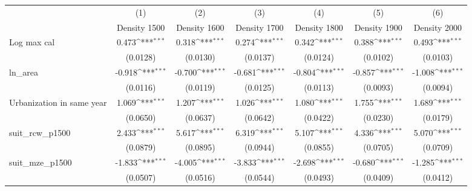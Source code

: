 {
\def\sym#1{\ifmmode^{#1}\else\(^{#1}\)\fi}
\begin{tabular}{l*{6}{c}}
\toprule
                    &\multicolumn{1}{c}{(1)}&\multicolumn{1}{c}{(2)}&\multicolumn{1}{c}{(3)}&\multicolumn{1}{c}{(4)}&\multicolumn{1}{c}{(5)}&\multicolumn{1}{c}{(6)}\\
                    &\multicolumn{1}{c}{Density 1500}&\multicolumn{1}{c}{Density 1600}&\multicolumn{1}{c}{Density 1700}&\multicolumn{1}{c}{Density 1800}&\multicolumn{1}{c}{Density 1900}&\multicolumn{1}{c}{Density 2000}\\
\midrule
Log max cal         &       0.473\sym{***}&       0.318\sym{***}&       0.274\sym{***}&       0.342\sym{***}&       0.388\sym{***}&       0.493\sym{***}\\
                    &    (0.0128)         &    (0.0130)         &    (0.0137)         &    (0.0124)         &    (0.0102)         &    (0.0103)         \\
\addlinespace
ln\_area             &      -0.918\sym{***}&      -0.700\sym{***}&      -0.681\sym{***}&      -0.804\sym{***}&      -0.857\sym{***}&      -1.008\sym{***}\\
                    &    (0.0116)         &    (0.0119)         &    (0.0125)         &    (0.0113)         &    (0.0093)         &    (0.0094)         \\
\addlinespace
Urbanization in same year&       1.069\sym{***}&       1.207\sym{***}&       1.026\sym{***}&       1.080\sym{***}&       1.755\sym{***}&       1.689\sym{***}\\
                    &    (0.0650)         &    (0.0637)         &    (0.0642)         &    (0.0422)         &    (0.0230)         &    (0.0179)         \\
\addlinespace
suit\_rcw\_p1500      &       2.433\sym{***}&       5.617\sym{***}&       6.319\sym{***}&       5.107\sym{***}&       4.336\sym{***}&       5.070\sym{***}\\
                    &    (0.0879)         &    (0.0895)         &    (0.0944)         &    (0.0855)         &    (0.0705)         &    (0.0709)         \\
\addlinespace
suit\_mze\_p1500      &      -1.833\sym{***}&      -4.005\sym{***}&      -3.833\sym{***}&      -2.698\sym{***}&      -0.680\sym{***}&      -1.285\sym{***}\\
                    &    (0.0507)         &    (0.0516)         &    (0.0544)         &    (0.0493)         &    (0.0409)         &    (0.0412)         \\

\end{tabular}}
